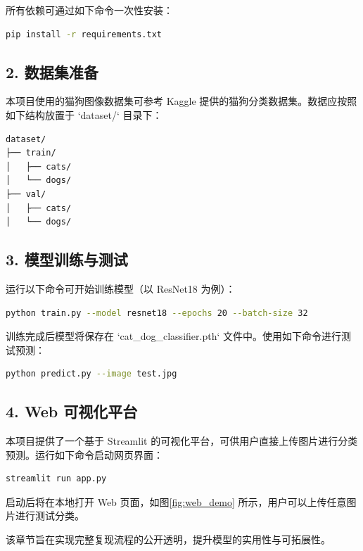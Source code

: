 \documentclass[10.5pt,compsoc]{CjC}
\theoremstyle{mystyle}
\begin{document}
\begin{CJK*}{GBK}{song}
所有依赖可通过如下命令一次性安装：

\begin{lstlisting}[language=bash]
pip install -r requirements.txt
\end{lstlisting}

\subsection*{2. 数据集准备}

本项目使用的猫狗图像数据集可参考 Kaggle 提供的猫狗分类数据集。数据应按照如下结构放置于 `dataset/` 目录下：

\begin{lstlisting}[language=bash]
dataset/
├── train/
│   ├── cats/
│   └── dogs/
├── val/
│   ├── cats/
│   └── dogs/
\end{lstlisting}

\subsection*{3. 模型训练与测试}

运行以下命令可开始训练模型（以 ResNet18 为例）：

\begin{lstlisting}[language=bash]
python train.py --model resnet18 --epochs 20 --batch-size 32
\end{lstlisting}

训练完成后模型将保存在 `cat_dog_classifier.pth` 文件中。使用如下命令进行测试预测：

\begin{lstlisting}[language=bash]
python predict.py --image test.jpg
\end{lstlisting}

\subsection*{4. Web 可视化平台}

本项目提供了一个基于 Streamlit 的可视化平台，可供用户直接上传图片进行分类预测。运行如下命令启动网页界面：

\begin{lstlisting}[language=bash]
streamlit run app.py
\end{lstlisting}

启动后将在本地打开 Web 页面，如图\ref{fig:web_demo} 所示，用户可以上传任意图片进行测试分类。


\vspace{3mm}
{\begin{CJK*}{GBK}{hei}该章节旨在实现完整复现流程的公开透明，提升模型的实用性与可拓展性。\end{CJK*}}



\end{CJK*}
\end{document}
